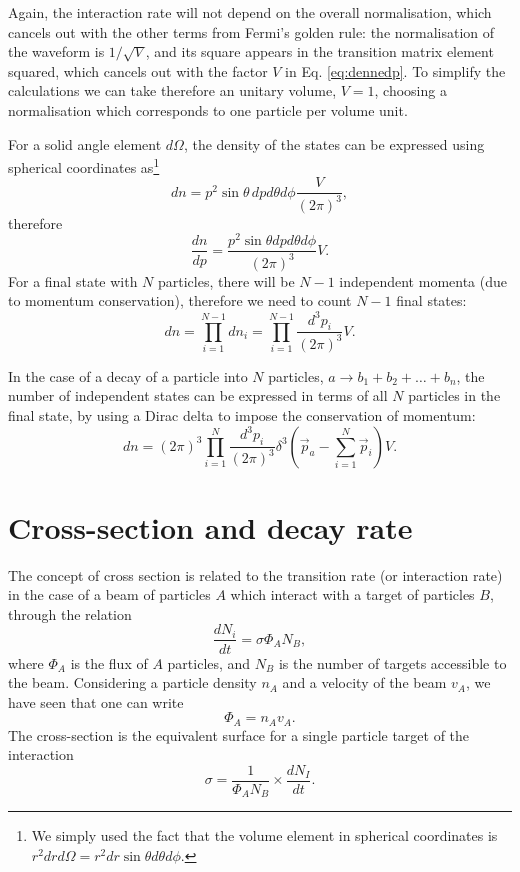 Again, the interaction rate will not depend on the overall normalisation, which cancels out with the other terms from Fermi's golden rule: the normalisation of the waveform is $1/\sqrt{V}$, and its square appears in the transition matrix element squared, which cancels out with the factor $V$ in Eq. \eqref{eq:dennedp}.
To simplify the calculations we can take therefore an unitary volume, $V=1$, choosing a normalisation which corresponds to one particle per volume unit.

For a solid angle element $d\Omega$, the density of the states can be expressed using spherical coordinates as\footnote{We simply used the fact that the volume element in spherical coordinates is $r^2drd\Omega=r^2dr\sin\theta d\theta d\phi$.}
\begin{equation*}
    dn = p^2\sin{\theta}\,dpd\theta d\phi \frac{V}{(2\pi)^3},
\end{equation*}
therefore
\begin{equation*}
    \frac{dn}{dp} = \frac{p^2\sin{\theta}dpd\theta d\phi}{(2\pi)^3}V.
\end{equation*}
For a final state with $N$ particles, there will be $N-1$ independent momenta (due to momentum conservation), therefore we need to count $N-1$ final states:
\begin{equation*}
    dn = \prod_{i=1}^{N-1}dn_i = \prod_{i=1}^{N-1}\frac{d^3p_i}{(2\pi)^3}V.
\end{equation*}

In the case of a decay of a particle into $N$ particles, $a\to b_1+b_2+\dots + b_n$, the number of independent states can be expressed in terms of all $N$ particles in the final state, by using a Dirac delta to impose the conservation of momentum:
\begin{equation*}
    dn = (2\pi)^3\prod_{i=1}^{N}\frac{d^3p_i}{(2\pi)^3}\delta^3\left(\vec{p}_a-\sum_{i=1}^N \vec{p}_i\right) V.
\end{equation*}

\section{Cross-section and decay rate}
The concept of cross section is related to the transition rate (or interaction rate) in the case of a beam of particles $A$ which interact with a target of particles $B$, through the relation
\begin{equation*}
    \frac{dN_i}{dt} = \sigma\Phi_A N_B,
\end{equation*}
where $\Phi_A$ is the flux of $A$ particles, and $N_B$ is the number of targets accessible to the beam. Considering a particle density $n_A$ and a velocity of the beam $v_A$, we have seen that one can write
\begin{equation*}
    \Phi_A = n_A v_A.
\end{equation*}
The cross-section is the equivalent surface for a single particle target of the interaction
\begin{equation*}
    \sigma = \frac{1}{\Phi_A N_B}\times \frac{dN_I}{dt}.
\end{equation*}

